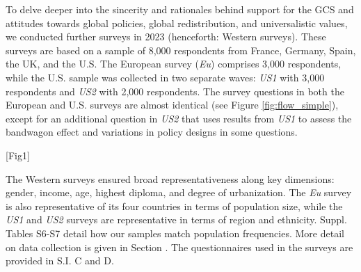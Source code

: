 
To delve deeper into the sincerity and rationales behind support for the GCS and attitudes towards global policies, global redistribution, and universalistic values, we conducted further surveys  in 2023 (henceforth: Western surveys). These surveys are based on a sample of 8,000 respondents from France, Germany, Spain, the UK, and the U.S. The European survey (\textit{Eu}) comprises 3,000 respondents, while the U.S. sample was collected in two separate waves: \textit{US1} with 3,000 respondents and \textit{US2} with 2,000 respondents. The survey questions in both the European and U.S. surveys are almost identical (see Figure \ref{fig:flow_simple}), except for an additional question in \textit{US2} that uses results from \textit{US1} to assess the bandwagon effect and variations in policy designs in some questions.

[Fig1] \label{fig:flow_simple}


The Western surveys ensured broad representativeness along key dimensions: gender, income, age, highest diploma, and degree of urbanization. The \textit{Eu} survey is also representative of its four countries in terms of population size, while the \textit{US1} and \textit{US2} surveys are representative in terms of region and ethnicity. 
Suppl. Tables S6-S7 %
detail how our samples match population frequencies. 
More detail on data collection is given in Section . The questionnaires used in the surveys are provided in S.I. C and D. %



